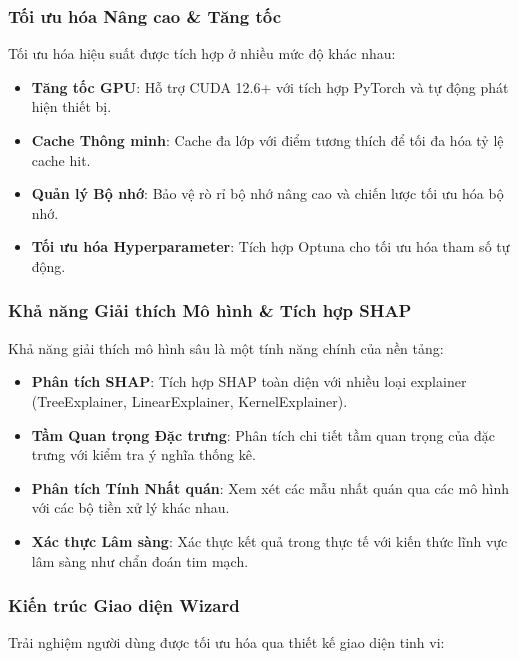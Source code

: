 \subsubsection{Tối ưu hóa Nâng cao \& Tăng tốc}

Tối ưu hóa hiệu suất được tích hợp ở nhiều mức độ khác nhau:

\begin{itemize}
    \item \textbf{Tăng tốc GPU}: Hỗ trợ CUDA 12.6+ với tích hợp PyTorch và tự động phát hiện thiết bị.
    \item \textbf{Cache Thông minh}: Cache đa lớp với điểm tương thích để tối đa hóa tỷ lệ cache hit.
    \item \textbf{Quản lý Bộ nhớ}: Bảo vệ rò rỉ bộ nhớ nâng cao và chiến lược tối ưu hóa bộ nhớ.
    \item \textbf{Tối ưu hóa Hyperparameter}: Tích hợp Optuna cho tối ưu hóa tham số tự động.
\end{itemize}

\subsubsection{Khả năng Giải thích Mô hình \& Tích hợp SHAP}\label{subsec:model-interpretability}

Khả năng giải thích mô hình sâu là một tính năng chính của nền tảng:

\begin{itemize}
    \item \textbf{Phân tích SHAP}: Tích hợp SHAP toàn diện với nhiều loại explainer (TreeExplainer, LinearExplainer, KernelExplainer).
    \item \textbf{Tầm Quan trọng Đặc trưng}: Phân tích chi tiết tầm quan trọng của đặc trưng với kiểm tra ý nghĩa thống kê.
    \item \textbf{Phân tích Tính Nhất quán}: Xem xét các mẫu nhất quán qua các mô hình với các bộ tiền xử lý khác nhau.
    \item \textbf{Xác thực Lâm sàng}: Xác thực kết quả trong thực tế với kiến thức lĩnh vực lâm sàng như chẩn đoán tim mạch.
\end{itemize}

\subsubsection{Kiến trúc Giao diện Wizard}\label{subsec:wizard-architecture}

Trải nghiệm người dùng được tối ưu hóa qua thiết kế giao diện tinh vi:

